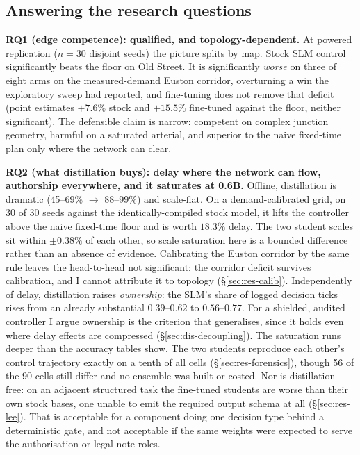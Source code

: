 \subsection{Answering the research questions}\label{sec:dis-rqs}
\textbf{RQ1 (edge competence): qualified, and topology-dependent.} At
powered replication ($n{=}30$ disjoint seeds) the picture splits by map.
Stock SLM control significantly beats the floor on Old Street. It is
significantly \emph{worse} on three of eight arms on the measured-demand
Euston corridor, overturning a win the exploratory sweep had reported, and
fine-tuning does not remove that deficit (point estimates $+7.6\%$ stock
and $+15.5\%$ fine-tuned against the floor, neither significant). The
defensible claim is narrow: competent on
complex junction geometry, harmful on a saturated arterial, and superior
to the naive fixed-time plan only where the network can clear.

\textbf{RQ2 (what distillation buys): delay where the network can flow,
authorship everywhere, and it saturates at 0.6B.} Offline, distillation is
dramatic (45--69\% $\to$ 88--99\%) and scale-flat. On a demand-calibrated
grid, on 30 of 30 seeds against the identically-compiled stock model, it
lifts the controller above the naive fixed-time floor and is worth
$18.3\%$ delay. The two student scales sit within $\pm0.38\%$ of each
other, so scale saturation here is a bounded difference rather than an
absence of evidence. Calibrating the Euston corridor by the same rule
leaves the head-to-head not significant: the corridor deficit survives
calibration, and I cannot attribute it to topology
(\S\ref{sec:res-calib}). Independently of delay, distillation raises
\emph{ownership}: the SLM's share of logged decision ticks rises from an
already substantial $0.39$--$0.62$ to $0.56$--$0.77$. For a shielded,
audited controller I argue ownership is the criterion that generalises,
since it holds even where delay effects are compressed
(\S\ref{sec:dis-decoupling}). The saturation runs deeper than the accuracy
tables show. The two students reproduce each other's control trajectory
exactly on a tenth of all cells (\S\ref{sec:res-forensics}), though 56 of
the 90 cells still differ and no ensemble was built or costed. Nor is
distillation free: on an adjacent structured task the fine-tuned students
are worse than their own stock bases, one unable to emit the required
output schema at all (\S\ref{sec:res-lee}). That is acceptable for a
component doing one decision type behind a deterministic gate, and not
acceptable if the same weights were expected to serve the authorisation or
legal-note roles.


